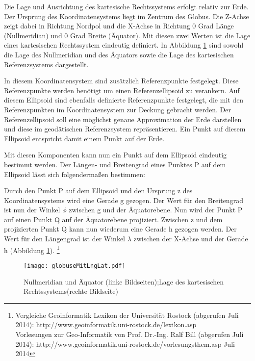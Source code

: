 			Die Lage und Ausrichtung des kartesische Rechtssystems erfolgt relativ zur Erde. 
			Der Ursprung des Koordinatensystems liegt im Zentrum des Globus.
			Die Z-Achse zeigt dabei in Richtung Nordpol und die X-Achse in Richtung 0 Grad Länge (Nullmeridian) und 0 Grad Breite (Äquator). 
			Mit diesen zwei Werten ist die Lage eines kartesischen Rechtssystem eindeutig definiert.
			In Abbildung \ref{img:lnglat} sind sowohl die Lage des Nullmeridian und des Äquators sowie die Lage des kartesischen Referenzsystems dargestellt. 

			In diesem Koordinatensystem sind zusätzlich Referenzpunkte festgelegt.
			Diese Referenzpunkte werden benötigt um einen Referenzellipsoid zu verankern. 
			Auf diesem Ellipsoid sind ebenfalls definierte Referenzpunkte festgelegt, die mit den Referenzpunkten im Koordinatensystem zur Deckung gebracht werden.
			Der Referenzellipsoid soll eine möglichst genaue Approximation der Erde darstellen und diese im geodätischen Referenzsystem repräsentieren. 
			Ein Punkt auf diesem Ellipsoid entspricht damit einem Punkt auf der Erde.

			Mit diesen Komponenten kann nun ein Punkt auf dem Ellipsoid eindeutig bestimmt werden.
			Der Längen- und Breitengrad eines Punktes P auf dem Ellipsoid lässt sich folgendermaßen bestimmen:

			Durch den Punkt P auf dem Ellipsoid und den Ursprung z des Koordinatensystems wird eine Gerade g gezogen. 
			Der Wert für den Breitengrad ist nun der Winkel $\phi$ zwischen g und der Äquatorebene.
			Nun wird der Punkt P auf einen Punkt Q auf der Äquatorebene projiziert.
			Zwischen z und dem projizierten Punkt Q kann nun wiederum eine Gerade h gezogen werden.
			Der Wert für den Längengrad ist der Winkel $\lambda$ zwischen der X-Achse und der Gerade h (Abbildung \ref{img:lnglat}).
			\footnote{Vergleiche Geoinformatik Lexikon der Universität Rostock (abgerufen Juli 2014): http://www.geoinformatik.uni-rostock.de/lexikon.asp \\ Vorlesungen zur Geo-Informatik von Prof. Dr.-Ing. Ralf Bill (abgerufen Juli 2014): http://www.geoinformatik.uni-rostock.de/vorlesungsthem.asp \label{ft:geoinfolex}  Juli 2014}



			\begin{figure}[h!]
			\begin{center}
				\texttt{[image: globuseMitLngLat.pdf]}
				\caption{Nullmeridian und Äquator (linke Bildseiten);Lage des kartesischen Rechtssystems(rechte Bildseite)}
				\label{img:lnglat}
			\end{center}
			\end{figure}	

